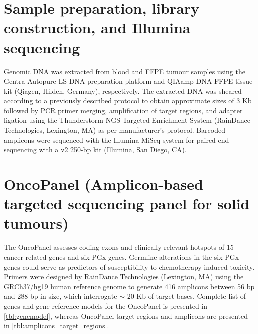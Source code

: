 \section{Sample preparation, library construction, and Illumina sequencing}
\label{sec:Samplepreparation,libraryconstruction,andIlluminasequencing}

Genomic DNA was extracted from blood and FFPE tumour samples using the Gentra Autopure LS DNA preparation platform and QIAamp DNA FFPE tissue kit (Qiagen, Hilden, Germany), respectively. The extracted DNA was sheared according to a previously described protocol \cite{Bosdet2013} to obtain approximate sizes of 3 Kb followed by PCR primer merging, amplification of target regions, and adapter ligation using the Thunderstorm NGS Targeted Enrichment System (RainDance Technologies, Lexington, MA) as per manufacturer's protocol. Barcoded amplicons were sequenced with the Illumina MiSeq system for paired end sequencing with a v2 250-bp kit (Illumina, San Diego, CA).

\newpage
\section{OncoPanel (Amplicon-based targeted sequencing panel for solid tumours)}
\label{sec:OncoPanel}

The OncoPanel assesses coding exons and clinically relevant hotspots of 15 cancer-related genes and six PGx genes. Germline alterations in the six PGx genes could serve as predictors of susceptibility to chemotherapy-induced toxicity. Primers were designed by RainDance Technologies (Lexington, MA) using the GRCh37/hg19 human reference genome to generate 416 amplicons between 56 bp and 288 bp in size, which interrogate $\sim$ 20 Kb of target bases. Complete list of genes and gene reference models for the OncoPanel is presented in \autoref{tbl:genemodel}, whereas OncoPanel target regions and amplicons are presented in \autoref{tbl:amplicons_target_regions}.

